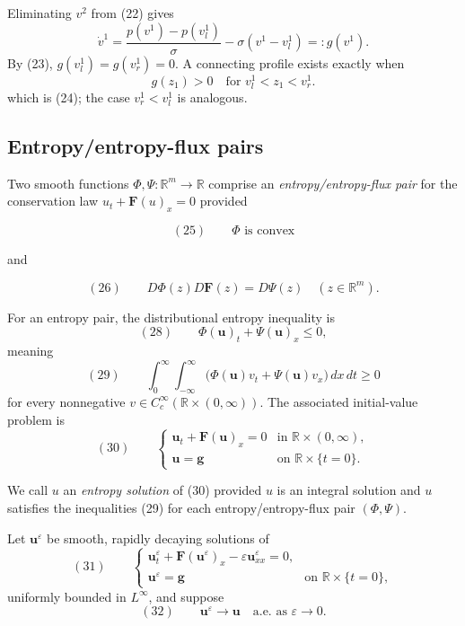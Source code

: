 \begin{example}
Eliminating $v^2$ from (22) gives
$$\dot v^1 = \frac{p(v^1)-p(v^1_l)}{\sigma} - \sigma(v^1-v^1_l) =: g(v^1).$$
By (23), $g(v^1_l)=g(v^1_r)=0$. A connecting profile exists exactly when
$$g(z_1) > 0 \quad \text{for } v^1_l < z_1 < v^1_r.$$
which is (24); the case $v^1_r<v^1_l$ is analogous.
\end{example}

\subsection{Entropy/entropy-flux pairs}\label{sec:entropy-entropy-flux-pairs}

\begin{definition}
\label{def:entropy-entropy-flux-pair-system}
Two smooth functions $\Phi, \Psi:\mathbb{R}^m\to\mathbb{R}$ comprise an \textit{entropy/entropy-flux pair} for the conservation law $u_t + \mathbf{F}(u)_x = 0$ provided

$$(25) \qquad \Phi \text{ is convex}$$

and

$$(26) \qquad D\Phi(z)D\mathbf{F}(z) = D\Psi(z) \quad (z\in\mathbb{R}^m).$$
\end{definition}

For an entropy pair, the distributional entropy inequality is
\[
(28)\qquad \Phi(\mathbf u)_t+\Psi(\mathbf u)_x\leq0,
\]
meaning
\[
(29)\qquad
\int_0^\infty\!\int_{-\infty}^{\infty}
\bigl(\Phi(\mathbf u)v_t+\Psi(\mathbf u)v_x\bigr)\,dx\,dt\geq0
\]
for every nonnegative $v\in C_c^\infty(\mathbb R\times(0,\infty))$. The associated initial-value problem is
\[
(30)\qquad
\begin{cases}
\mathbf u_t+\mathbf F(\mathbf u)_x=0 & \text{in }\mathbb R\times(0,\infty),\\
\mathbf u=\mathbf g & \text{on }\mathbb R\times\{t=0\}.
\end{cases}
\]

\begin{definition}
\label{def:entropy-solution-system}
We call $u$ an \textit{entropy solution} of (30) provided $u$ is an integral solution and $u$ satisfies the inequalities (29) for each entropy/entropy-flux pair $(\Phi,\Psi)$.
\end{definition}

Let $\mathbf u^\varepsilon$ be smooth, rapidly decaying solutions of
\[
(31)\qquad
\begin{cases}
\mathbf u_t^\varepsilon+\mathbf F(\mathbf u^\varepsilon)_x
-\varepsilon\mathbf u_{xx}^\varepsilon=0,\\
\mathbf u^\varepsilon=\mathbf g & \text{on }\mathbb R\times\{t=0\},
\end{cases}
\]
uniformly bounded in $L^\infty$, and suppose
\[
(32)\qquad \mathbf u^\varepsilon\to\mathbf u\quad\text{a.e. as }\varepsilon\to0.
\]


